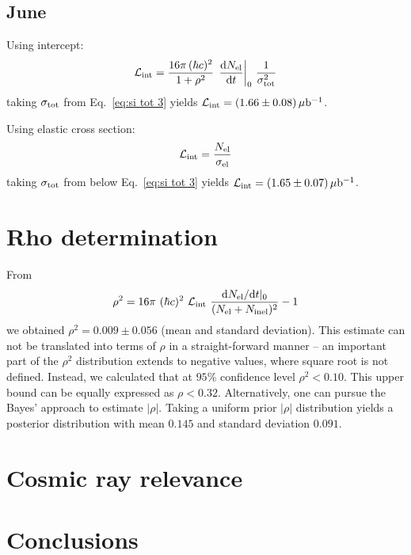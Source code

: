 \documentclass[doublecol]{../macros/epl2}
\def\d{{\rm d}}
\def\un#1{\,{\rm #1}}
\begin{document}
\subsection{June}
Using intercept:
\begin{equation}
\label{eq:lumi jun 1}
{\cal L_{\rm int}} =  {16\pi\, (\hbar c)^2\over 1 + \rho^2}\, \left. \d N_{\rm el}\over\d t\right|_0\, {1\over \sigma_{\rm tot}^2}
\end{equation}
taking $\sigma_{\rm tot}$ from Eq.~\ref{eq:si tot 3} yields ${\cal L_{\rm int}} = (1.66 \pm 0.08)\un{\mu b^{-1}}$.

Using elastic cross section:
\begin{equation}
\label{eq:lumi jun 1}
{\cal L_{\rm int}} = {N_{\rm el}\over \sigma_{\rm el}}
\end{equation}
taking $\sigma_{\rm tot}$ from below Eq.~\ref{eq:si tot 3} yields ${\cal L_{\rm int}} = (1.65 \pm 0.07)\un{\mu b^{-1}}$.



\section{Rho determination}

From
\begin{equation}
\label{eq:rho}
\rho^2 = 16\pi\ (\hbar c)^2\ {\cal L_{\rm int}}\ {\d N_{\rm el}/\d t|_0\over (N_{\rm el} + N_{\rm inel})^2} - 1
\end{equation}
we obtained $\rho^2 = 0.009 \pm 0.056$ (mean and standard deviation). This estimate can not be translated into terms of $\rho$ in a straight-forward manner -- an important part of the $\rho^2$ distribution extends to negative values, where square root is not defined. Instead, we calculated that at $95\%$ confidence level $\rho^2 < 0.10$. This upper bound can be equally expressed as $\rho < 0.32$. Alternatively, one can pursue the Bayes' approach to estimate $|\rho|$. Taking a uniform prior $|\rho|$ distribution yields a posterior distribution with mean $0.145$ and standard deviation $0.091$.



\section{Cosmic ray relevance}



	
\section{Conclusions}
\end{document}
